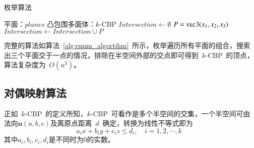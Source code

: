 \begin{algorithm}[htbp]
\small
\caption{枚举算法}
\label{alg:enum_algortihm}
\begin{algorithmic}[1]
\Require
平面：$planes$
\Ensure
凸包围多面体：$k$-CBP
    \State $Intersection \gets \emptyset $
                      \State $P = \Call{vec3}{x_1, x_2, x_3}$
                        \State {}
                        \State $Intersection \gets Intersection \cup P$
                      \EndIf
                  \EndIf
              \EndIf
          \EndFor
     \EndFor
     \EndIf
  \EndFor
  \State {}
\EndFunction
\end{algorithmic}
\end{algorithm}

完整的算法如算法~\ref{alg:enum_algortihm}~所示，枚举遍历所有平面的组合，搜索出三个平面交于一点的情况，排除在半空间外部的交点即可得到~$k$-CBP~的顶点，算法复杂度为~$O(n^3)$。

\subsection{对偶映射算法}
\label{subsec:intersection-dual-mapping}

正如~$k$-CBP~的定义所知，$k$-CBP~可看作是多个半空间的交集，一个半空间可由法向$\bm{n}(a,b,c)$及离原点距离~$d$~确定，转换为线性不等式即为
\begin{equation}
  \label{equa:halfspace:defition}
  a_ix+b_iy+c_iz \leq d_i, \quad i=1,2,\cdots,k
\end{equation}
其中$a_i,b_i,c_i,d_i$是不同时为0的实数。

